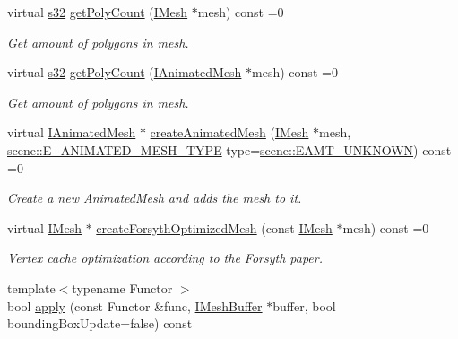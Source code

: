 \begin{DoxyCompactItemize}
virtual \hyperlink{namespaceirr_ac66849b7a6ed16e30ebede579f9b47c6}{s32} \hyperlink{classirr_1_1scene_1_1IMeshManipulator_a914c8cbfbde1428dea91b34fe99e716d}{get\+Poly\+Count} (\hyperlink{classirr_1_1scene_1_1IMesh}{I\+Mesh} $\ast$mesh) const =0
\begin{DoxyCompactList}\small\item\em Get amount of polygons in mesh. \end{DoxyCompactList}\item 
virtual \hyperlink{namespaceirr_ac66849b7a6ed16e30ebede579f9b47c6}{s32} \hyperlink{classirr_1_1scene_1_1IMeshManipulator_af20519dbaa2c2c346e8ddf7c94babc38}{get\+Poly\+Count} (\hyperlink{classirr_1_1scene_1_1IAnimatedMesh}{I\+Animated\+Mesh} $\ast$mesh) const =0
\begin{DoxyCompactList}\small\item\em Get amount of polygons in mesh. \end{DoxyCompactList}\item 
virtual \hyperlink{classirr_1_1scene_1_1IAnimatedMesh}{I\+Animated\+Mesh} $\ast$ \hyperlink{classirr_1_1scene_1_1IMeshManipulator_a08c2483575a88f68d099690932c11562}{create\+Animated\+Mesh} (\hyperlink{classirr_1_1scene_1_1IMesh}{I\+Mesh} $\ast$mesh, \hyperlink{namespaceirr_1_1scene_a2fc85a64604521ca063f1881b5dd1c61}{scene\+::\+E\+\_\+\+A\+N\+I\+M\+A\+T\+E\+D\+\_\+\+M\+E\+S\+H\+\_\+\+T\+Y\+PE} type=\hyperlink{namespaceirr_1_1scene_a2fc85a64604521ca063f1881b5dd1c61a2db2999504900cad42b9295f4198434f}{scene\+::\+E\+A\+M\+T\+\_\+\+U\+N\+K\+N\+O\+WN}) const =0
\begin{DoxyCompactList}\small\item\em Create a new Animated\+Mesh and adds the mesh to it. \end{DoxyCompactList}\item 
virtual \hyperlink{classirr_1_1scene_1_1IMesh}{I\+Mesh} $\ast$ \hyperlink{classirr_1_1scene_1_1IMeshManipulator_a5003ca5eabee96fe1c871bdb25ae43fd}{create\+Forsyth\+Optimized\+Mesh} (const \hyperlink{classirr_1_1scene_1_1IMesh}{I\+Mesh} $\ast$mesh) const =0
\begin{DoxyCompactList}\small\item\em Vertex cache optimization according to the Forsyth paper. \end{DoxyCompactList}\item 
{\footnotesize template$<$typename Functor $>$ }\\bool \hyperlink{classirr_1_1scene_1_1IMeshManipulator_a6d685fb465a8b5efecd0825b74099ceb}{apply} (const Functor \&func, \hyperlink{classirr_1_1scene_1_1IMeshBuffer}{I\+Mesh\+Buffer} $\ast$buffer, bool bounding\+Box\+Update=false) const

\end{DoxyCompactItemize}
